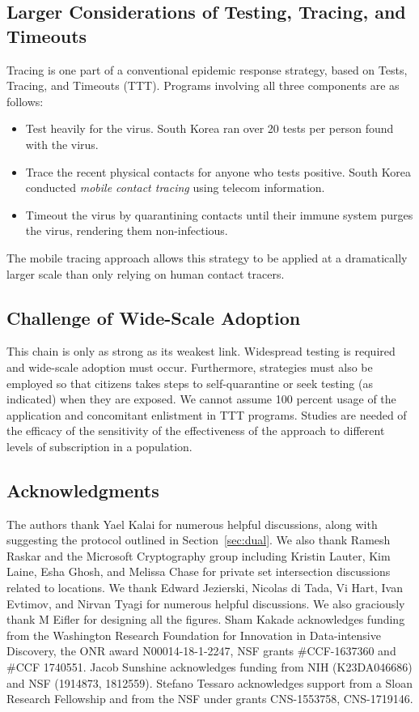\subsection{Larger Considerations of Testing, Tracing, and Timeouts}
Tracing is one part of a conventional epidemic response strategy, based on Tests, Tracing, and Timeouts (TTT). Programs involving all three components are as follows:
\begin{itemize}
\item Test heavily for the virus.  South Korea ran over 20 tests per person found with the virus. 
\item Trace the recent physical contacts for anyone who tests positive.  South Korea conducted \emph{mobile contact tracing} using telecom information.
\item Timeout the virus by quarantining contacts until their immune system purges the virus, rendering them non-infectious.
\end{itemize}
The mobile tracing approach allows this strategy to be applied at a dramatically larger scale than only relying on human contact tracers.  

\subsection{Challenge of Wide-Scale Adoption}
This chain is only as strong as its weakest link.  Widespread testing is required and wide-scale adoption must occur. Furthermore, strategies must also be employed so that citizens takes steps to self-quarantine or seek testing (as indicated) when they are exposed. We cannot assume 100 percent usage of the application and concomitant enlistment in TTT programs.  Studies are needed of the efficacy of the sensitivity of the effectiveness of the approach to different levels of subscription in a population.

\subsection*{Acknowledgments}
The authors thank Yael Kalai for numerous helpful discussions, along with suggesting the protocol outlined in Section~\ref{sec:dual}. We also thank Ramesh Raskar and the Microsoft Cryptography group including Kristin Lauter, Kim Laine, Esha Ghosh, and Melissa Chase for private set intersection discussions related to locations.
We thank Edward Jezierski, Nicolas di Tada, Vi Hart, Ivan Evtimov, and Nirvan Tyagi for numerous helpful discussions. We also graciously thank M Eifler for designing all the figures.
Sham Kakade acknowledges funding from the Washington Research
Foundation for Innovation in Data-intensive Discovery, the ONR award
N00014-18-1-2247, NSF grants \#CCF-1637360 and \#CCF 1740551. Jacob Sunshine acknowledges
funding from NIH (K23DA046686) and NSF (1914873, 1812559). Stefano Tessaro acknowledges support from a Sloan Research Fellowship and from the NSF under grants CNS-1553758, CNS-1719146.


